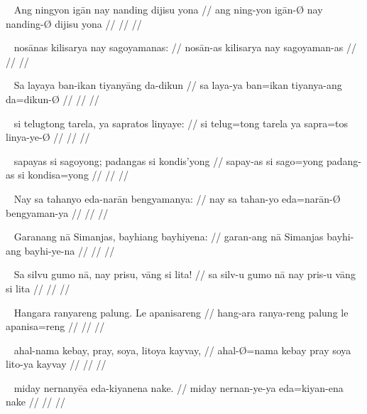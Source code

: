 \ex~\begingl
	\gla Ang ningyon igān nay nanding dijisu yona //
	\glb ang ning-yon igān-Ø nay nanding-Ø dijisu yona //
	\glc  //
	\glft  //
\endgl

\ex~\begingl
	\gla nosānas kilisarya nay sagoyamanas: //
	\glb nosān-as kilisarya nay sagoyaman-as //
	\glc  //
	\glft  //
\endgl

\ex~\begingl
	\gla Sa layaya ban-ikan tiyanyāng da-dikun //
	\glb sa laya-ya ban=ikan tiyanya-ang da=dikun-Ø //
	\glc  //
	\glft  //
\endgl

\ex~\begingl
	\gla si telugtong tarela, ya sapratos linyaye: //
	\glb si telug=tong tarela ya sapra=tos linya-ye-Ø //
	\glc  //
	\glft  //
\endgl

\ex~\begingl
	\gla sapayas si sagoyong; padangas si kondis'yong //
	\glb sapay-as si sago=yong padang-as si kondisa=yong //
	\glc  //
	\glft  //
\endgl

\ex~\begingl
	\gla Nay sa tahanyo eda-narān bengyamanya: //
	\glb nay sa tahan-yo eda=narān-Ø bengyaman-ya //
	\glc  //
	\glft  //
\endgl

\ex~\begingl
	\gla Garanang nā Simanjas, bayhiang bayhiyena: //
	\glb garan-ang nā Simanjas bayhi-ang bayhi-ye-na //
	\glc  //
	\glft  //
\endgl

\ex~\begingl
	\gla Sa silvu gumo nā, nay prisu, vāng si lita! //
	\glb sa silv-u gumo nā nay pris-u vāng si lita //
	\glc  //
	\glft  //
\endgl

\ex~\begingl
	\gla Hangara ranyareng palung. Le apanisareng //
	\glb hang-ara ranya-reng palung le apanisa=reng //
	\glc  //
	\glft  //
\endgl

\ex~\begingl
	\gla ahal-nama kebay, pray, soya, litoya kayvay, //
	\glb ahal-Ø=nama kebay pray soya lito-ya kayvay //
	\glc  //
	\glft  //
\endgl

\ex~\begingl
	\gla miday nernanyēa eda-kiyanena nake. //
	\glb miday nernan-ye-ya eda=kiyan-ena nake //
	\glc  //
	\glft  //
\endgl
